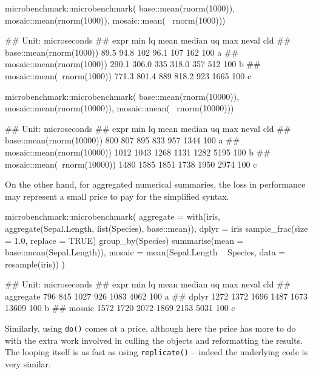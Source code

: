 \begin{Schunk}
\begin{Sinput}
microbenchmark::microbenchmark( 
  base::mean(rnorm(1000)), 
  mosaic::mean(rnorm(1000)), 
  mosaic::mean(~ rnorm(1000)))
\end{Sinput}
\begin{Soutput}
## Unit: microseconds
##                        expr   min    lq mean median  uq  max neval cld
##     base::mean(rnorm(1000))  89.5  94.8  102   96.1 107  162   100 a  
##   mosaic::mean(rnorm(1000)) 290.1 306.0  335  318.0 357  512   100  b 
##  mosaic::mean(~rnorm(1000)) 771.3 801.4  889  818.2 923 1665   100   c
\end{Soutput}
\begin{Sinput}
microbenchmark::microbenchmark( 
  base::mean(rnorm(10000)), 
  mosaic::mean(rnorm(10000)), 
  mosaic::mean(~ rnorm(10000)))
\end{Sinput}
\begin{Soutput}
## Unit: microseconds
##                         expr  min   lq mean median   uq  max neval cld
##     base::mean(rnorm(10000))  800  807  895    833  957 1344   100 a  
##   mosaic::mean(rnorm(10000)) 1012 1043 1268   1131 1282 5195   100  b 
##  mosaic::mean(~rnorm(10000)) 1480 1585 1851   1738 1950 2974   100   c
\end{Soutput}
\end{Schunk}

On the other hand, for aggregated numerical summaries, the loss in
performance may represent a small price to pay for the simplified
syntax.

\begin{Schunk}
\begin{Sinput}
microbenchmark::microbenchmark( 
  aggregate = with(iris, aggregate(Sepal.Length, list(Species), base::mean)),
  dplyr = iris %
    sample_frac(size = 1.0, replace = TRUE) %
    group_by(Species) %
    summarise(mean = base::mean(Sepal.Length)),
  mosaic = mean(Sepal.Length ~ Species, data = resample(iris))
)
\end{Sinput}
\begin{Soutput}
## Unit: microseconds
##       expr  min   lq mean median   uq   max neval cld
##  aggregate  796  845 1027    926 1083  4062   100 a  
##      dplyr 1272 1372 1696   1487 1673 13609   100  b 
##     mosaic 1572 1720 2072   1869 2153  5031   100   c
\end{Soutput}
\end{Schunk}

Similarly, using \texttt{do()} comes at a price, although here the price
has more to do with the extra work involved in culling the objects and
reformatting the results. The looping itself is as fast as using
\texttt{replicate()} -- indeed the underlying code is very similar.

